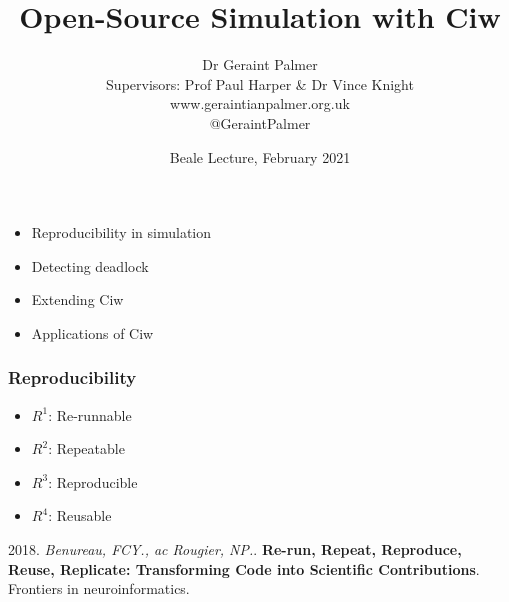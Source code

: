 \documentclass[xcolor={table}]{beamer}
\title{Open-Source Simulation with Ciw}
\author{Dr Geraint Palmer\\Supervisors: Prof Paul Harper \& Dr Vince Knight\\\textcolor{textorange}{www.geraintianpalmer.org.uk}\\\textcolor{textorange}{@GeraintPalmer} \vspace{-5mm}}
\date{Beale Lecture, February 2021}
\begin{document}
\frame{\titlepage}

\begin{frame}
\begin{itemize}
  \item Reproducibility in simulation
  \item Detecting deadlock
  \item Extending Ciw
  \item Applications of Ciw
\end{itemize}
\end{frame}

\begin{frame}
\frametitle{Reproducibility}

\vfill

\begin{itemize}
  \item $R^1$: Re-runnable
  \item $R^2$: Repeatable
  \item $R^3$: Reproducible
  \item $R^4$: Reusable
\end{itemize}

\vfill

\scriptsize{\textcolor{textorange}{2018. \textit{Benureau, FCY., ac Rougier, NP.}. \textbf{Re-run, Repeat, Reproduce, Reuse, Replicate: Transforming Code into Scientific Contributions}. Frontiers in neuroinformatics.}}
\end{frame}
\end{document}
